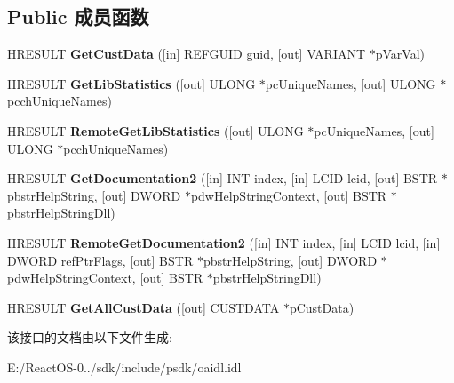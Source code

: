 \subsection*{Public 成员函数}
\begin{DoxyCompactItemize}
\item 
\mbox{\label{interface_i_type_lib2_a8c30aaaef14550871e029a1581252f7f}} 
H\+R\+E\+S\+U\+LT {\bfseries Get\+Cust\+Data} (\mbox{[}in\mbox{]} \hyperlink{struct___g_u_i_d}{R\+E\+F\+G\+U\+ID} guid, \mbox{[}out\mbox{]} \hyperlink{structtag_v_a_r_i_a_n_t}{V\+A\+R\+I\+A\+NT} $\ast$p\+Var\+Val)
\item 
\mbox{\label{interface_i_type_lib2_aa9c5cedbe2f8fa5103d14f1f76373ae1}} 
H\+R\+E\+S\+U\+LT {\bfseries Get\+Lib\+Statistics} (\mbox{[}out\mbox{]} U\+L\+O\+NG $\ast$pc\+Unique\+Names, \mbox{[}out\mbox{]} U\+L\+O\+NG $\ast$pcch\+Unique\+Names)
\item 
\mbox{\label{interface_i_type_lib2_abd567438c689855041cbc597e441aae9}} 
H\+R\+E\+S\+U\+LT {\bfseries Remote\+Get\+Lib\+Statistics} (\mbox{[}out\mbox{]} U\+L\+O\+NG $\ast$pc\+Unique\+Names, \mbox{[}out\mbox{]} U\+L\+O\+NG $\ast$pcch\+Unique\+Names)
\item 
\mbox{\label{interface_i_type_lib2_ad2e9fcb4b00df994a1aa966cc7ccf634}} 
H\+R\+E\+S\+U\+LT {\bfseries Get\+Documentation2} (\mbox{[}in\mbox{]} I\+NT index, \mbox{[}in\mbox{]} L\+C\+ID lcid, \mbox{[}out\mbox{]} B\+S\+TR $\ast$pbstr\+Help\+String, \mbox{[}out\mbox{]} D\+W\+O\+RD $\ast$pdw\+Help\+String\+Context, \mbox{[}out\mbox{]} B\+S\+TR $\ast$pbstr\+Help\+String\+Dll)
\item 
\mbox{\label{interface_i_type_lib2_a2f19d3b1fe6a695ca381ec1d2d09a990}} 
H\+R\+E\+S\+U\+LT {\bfseries Remote\+Get\+Documentation2} (\mbox{[}in\mbox{]} I\+NT index, \mbox{[}in\mbox{]} L\+C\+ID lcid, \mbox{[}in\mbox{]} D\+W\+O\+RD ref\+Ptr\+Flags, \mbox{[}out\mbox{]} B\+S\+TR $\ast$pbstr\+Help\+String, \mbox{[}out\mbox{]} D\+W\+O\+RD $\ast$pdw\+Help\+String\+Context, \mbox{[}out\mbox{]} B\+S\+TR $\ast$pbstr\+Help\+String\+Dll)
\item 
\mbox{\label{interface_i_type_lib2_a07d207311c6d4777a51fcb838fa67a17}} 
H\+R\+E\+S\+U\+LT {\bfseries Get\+All\+Cust\+Data} (\mbox{[}out\mbox{]} C\+U\+S\+T\+D\+A\+TA $\ast$p\+Cust\+Data)
\end{DoxyCompactItemize}


该接口的文档由以下文件生成\+:\begin{DoxyCompactItemize}
\item 
E\+:/\+React\+O\+S-\/0../sdk/include/psdk/oaidl.\+idl\end{DoxyCompactItemize}
